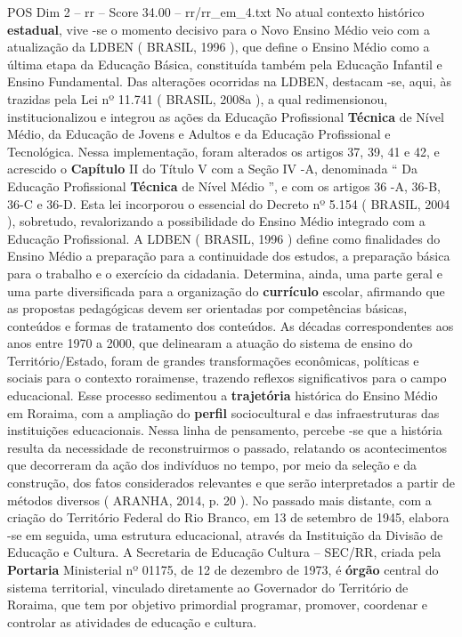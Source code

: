 \begin{textsample}{POS Dim 2 – rr – Score 34.00 – rr/rr\_em\_4.txt}
No atual contexto histórico \textbf{estadual}, vive -se o momento decisivo para o Novo Ensino Médio veio com a atualização da LDBEN ( BRASIL, 1996 ), que define o Ensino Médio como a última etapa da Educação Básica, constituída também pela Educação Infantil e Ensino Fundamental.
Das alterações ocorridas na LDBEN, destacam -se, aqui, às trazidas pela Lei nº 11.741 ( BRASIL, 2008a ), a qual redimensionou, institucionalizou e integrou as ações da Educação Profissional \textbf{Técnica} de Nível Médio, da Educação de Jovens e Adultos e da Educação Profissional e Tecnológica.
Nessa implementação, foram alterados os artigos 37, 39, 41 e 42, e acrescido o \textbf{Capítulo} II do Título V com a Seção IV -A, denominada “ Da Educação Profissional \textbf{Técnica} de Nível Médio ”, e com os artigos 36 -A, 36-B, 36-C e 36-D.
Esta lei incorporou o essencial do Decreto nº 5.154 ( BRASIL, 2004 ), sobretudo, revalorizando a possibilidade do Ensino Médio integrado com a Educação Profissional.
A LDBEN ( BRASIL, 1996 ) define como finalidades do Ensino Médio a preparação para a continuidade dos estudos, a preparação básica para o trabalho e o exercício da cidadania.
Determina, ainda, uma parte geral e uma parte diversificada para a organização do \textbf{currículo} escolar, afirmando que as propostas pedagógicas devem ser orientadas por competências básicas, conteúdos e formas de tratamento dos conteúdos.
As décadas correspondentes aos anos entre 1970 a 2000, que delinearam a atuação do sistema de ensino do Território/Estado, foram de grandes transformações econômicas, políticas e sociais para o contexto roraimense, trazendo reflexos significativos para o campo educacional.
Esse processo sedimentou a \textbf{trajetória} histórica do Ensino Médio em Roraima, com a ampliação do \textbf{perfil} sociocultural e das infraestruturas das instituições educacionais.
Nessa linha de pensamento, percebe -se que a história resulta da necessidade de reconstruirmos o passado, relatando os acontecimentos que decorreram da ação dos indivíduos no tempo, por meio da seleção e da construção, dos fatos considerados relevantes e que serão interpretados a partir de métodos diversos ( ARANHA, 2014, p. 20 ).
No passado mais distante, com a criação do Território Federal do Rio Branco, em 13 de setembro de 1945, elabora -se em seguida, uma estrutura educacional, através da Instituição da Divisão de Educação e Cultura.
A Secretaria de Educação Cultura – SEC/RR, criada pela \textbf{Portaria} Ministerial nº 01175, de 12 de dezembro de 1973, é \textbf{órgão} central do sistema territorial, vinculado diretamente ao Governador do Território de Roraima, que tem por objetivo primordial programar, promover, coordenar e controlar as atividades de educação e cultura.

\end{textsample}
